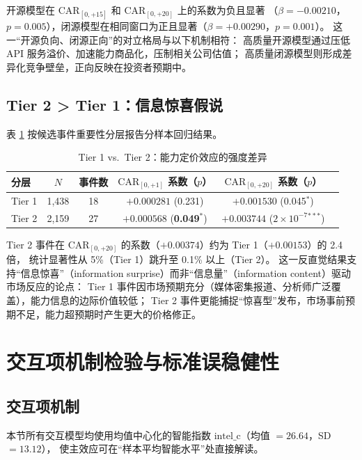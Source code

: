 \documentclass[11pt,fontset=fandol,a4paper]{ctexart}
\begin{document}
开源模型在 $\text{CAR}_{[0,+15]}$ 和 $\text{CAR}_{[0,+20]}$ 上的系数为负且显著
（$\beta=-0.00210$，$p=0.005$），闭源模型在相同窗口为正且显著（$\beta=+0.00290$，$p=0.001$）。
这一``开源负向、闭源正向''的对立格局与以下机制相符：
高质量开源模型通过压低 API 服务溢价、加速能力商品化，压制相关公司估值；
高质量闭源模型则形成差异化竞争壁垒，正向反映在投资者预期中。

\subsection{Tier 2 > Tier 1：信息惊喜假说}

表 \ref{tab:tier} 按候选事件重要性分层报告分样本回归结果。

\begin{table}[htbp]
\centering
\caption{Tier 1 vs.\ Tier 2：能力定价效应的强度差异}
\label{tab:tier}
\small
\begin{tabular}{lccccc}
\toprule
分层 & $N$ & 事件数 & $\text{CAR}_{[0,+1]}$ 系数（$p$） & $\text{CAR}_{[0,+20]}$ 系数（$p$） \\
\midrule
Tier 1 & 1{,}438 & 18 & $+0.000281$ (0.231) & $+0.001530$ (0.045$^{*}$) \\
Tier 2 & 2{,}159 & 27 & $+0.000568$ (\textbf{0.049$^{*}$}) & \textbf{$+0.003744$} (\textbf{$2\times10^{-7}$$^{***}$}) \\
\bottomrule
\end{tabular}
\end{table}

Tier 2 事件在 $\text{CAR}_{[0,+20]}$ 的系数（$+0.00374$）约为 Tier 1（$+0.00153$）的 2.4 倍，
统计显著性从 5\%（Tier 1）跳升至 0.1\% 以上（Tier 2）。
这一反直觉结果支持``信息惊喜''（information surprise）而非``信息量''（information content）驱动市场反应的论点：
Tier 1 事件因市场预期充分（媒体密集报道、分析师广泛覆盖），能力信息的边际价值较低；
Tier 2 事件更能捕捉``惊喜型''发布，市场事前预期不足，能力超预期时产生更大的价格修正。

\section{交互项机制检验与标准误稳健性}

\subsection{交互项机制}

本节所有交互模型均使用均值中心化的智能指数 $\text{intel\_c}$（均值 $=26.64$，SD $=13.12$），
使主效应可在``样本平均智能水平''处直接解读。
\end{document}
